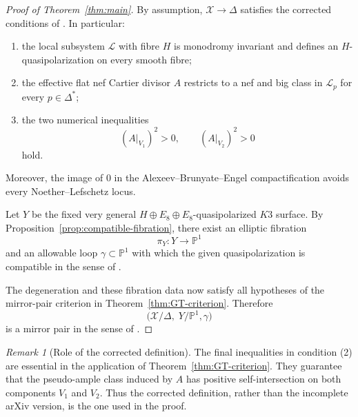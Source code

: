 \documentclass[11pt]{amsart}
\theoremstyle{definition}
\theoremstyle{remark}
\newtheorem{remark}[theorem]{Remark}
\newcommand{\cX}{\mathcal{X}}
\newcommand{\cL}{\mathcal{L}}
\newcommand{\D}{\Delta}
\newcommand{\PP}{\mathbb{P}}
\begin{document}
\begin{proof}[Proof of Theorem~\ref{thm:main}]
By assumption, $\cX\to\D$ satisfies the corrected conditions of
\cite[Definition~3.20]{dfk3slpms}.  In particular:
\begin{enumerate}
\item the local subsystem $\cL$ with fibre $H$ is monodromy invariant and
defines an $H$-quasipolarization on every smooth fibre;
\item the effective flat nef Cartier divisor $A$ restricts to a nef and big
class in $\cL_p$ for every $p\in\D^*$;
\item the two numerical inequalities
\[
(A|_{V_1})^2>0,\qquad (A|_{V_2})^2>0
\]
hold.
\end{enumerate}
Moreover, the image of $0$ in the Alexeev--Brunyate--Engel compactification
avoids every Noether--Lefschetz locus.

Let $Y$ be the fixed very general
$H\oplus E_8\oplus E_8$-quasipolarized $K3$ surface.  By
Proposition~\ref{prop:compatible-fibration}, there exist an elliptic
fibration
\[
\pi_Y\colon Y\longrightarrow \PP^1
\]
and an allowable loop $\gamma\subset\PP^1$ with which the given
quasipolarization is compatible in the sense of
\cite[Definition~4.21]{dfk3slpms}.

The degeneration and these fibration data now satisfy all hypotheses of the
mirror-pair criterion in Theorem~\ref{thm:GT-criterion}.  Therefore
\[
\bigl(\cX/\D,\;Y/\PP^1,\gamma\bigr)
\]
is a mirror pair in the sense of \cite[Definition~5.1]{dfk3slpms}.
\end{proof}

\begin{remark}[Role of the corrected definition]
The final inequalities in condition (2) are essential in the application of
Theorem~\ref{thm:GT-criterion}.  They guarantee that the pseudo-ample class
induced by $A$ has positive self-intersection on both components $V_1$ and
$V_2$.  Thus the corrected definition, rather than the incomplete arXiv
version, is the one used in the proof.
\end{remark}
\end{document}
